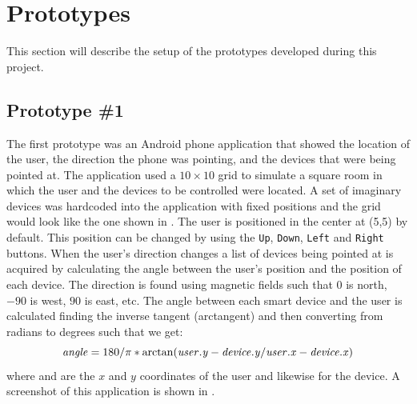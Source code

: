 \section{Prototypes}
This section will describe the setup of the prototypes developed during this project.

\subsection{Prototype \#1}
\label{sec:implementation:prototypes:prototype1}
The first prototype was an Android phone application that showed the location of the user, the direction the phone was pointing, and the devices that were being pointed at.
The application used a $10 \times 10$ grid to simulate a square room in which the user and the devices to be controlled were located.
A set of imaginary devices was hardcoded into the application with fixed positions and the grid would look like the one shown in .
The user is positioned in the center at (5,5) by default. This position can be changed by using the \texttt{Up}, \texttt{Down}, \texttt{Left} and \texttt{Right} buttons.
When the user's direction changes a list of devices being pointed at is acquired by calculating the angle between the user's position and the position of each device.
The direction is found using magnetic fields such that $0$ is north, $-90$ is west, $90$ is east, etc. 
The angle between each smart device and the user is calculated finding the inverse tangent (arctangent) and then converting from radians to degrees such that we get:
\begin{equation}
\var{angle} = 180 / \pi * \arctan(\var{user.y} - \var{device.y} / \var{user.x} - \var{device.x})
\end{equation}
where  and  are the $x$ and $y$ coordinates of the user and likewise for the device.
A screenshot of this application is shown in .

